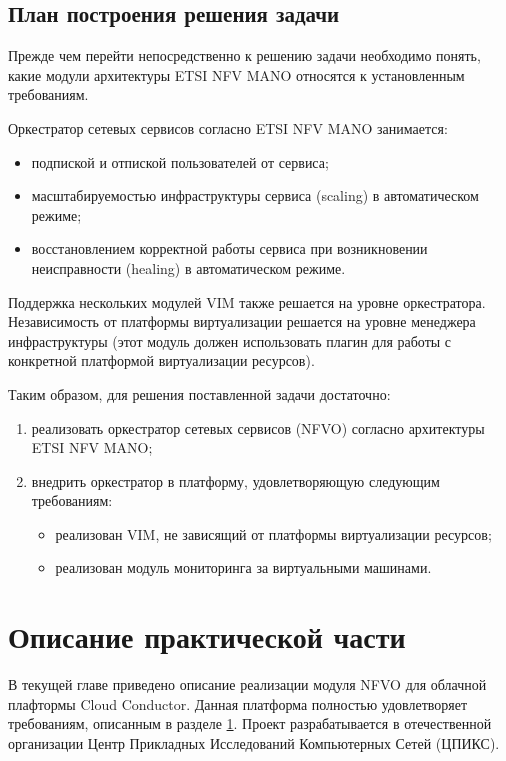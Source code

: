 \documentclass[oneside,final,14pt,a4paper]{extreport}
\begin{document}
\section{План построения решения задачи}
\label{section-platform-requirements}
Прежде чем перейти непосредственно к решению задачи необходимо понять, какие модули архитектуры ETSI NFV MANO относятся к установленным требованиям.

Оркестратор сетевых сервисов согласно ETSI NFV MANO занимается:
\begin{itemize}
	\item подпиской и отпиской пользователей от сервиса;
	\item масштабируемостью инфраструктуры сервиса (scaling) в автоматическом режиме;
	\item восстановлением корректной работы сервиса при возникновении неисправности (healing) в автоматическом режиме.
\end{itemize}

Поддержка нескольких модулей VIM также решается на уровне оркестратора. Независимость от платформы виртуализации решается на уровне менеджера инфраструктуры (этот модуль должен использовать плагин для работы с конкретной платформой виртуализации ресурсов).

Таким образом, для решения поставленной задачи достаточно:
\begin{enumerate}
	\item реализовать оркестратор сетевых сервисов (NFVO) согласно архитектуры ETSI NFV MANO;
	\item внедрить оркестратор в платформу, удовлетворяющую следующим требованиям:
	\begin{itemize}
		\item реализован VIM, не зависящий от платформы виртуализации ресурсов;
		\item реализован модуль мониторинга за виртуальными машинами.
	\end{itemize}
\end{enumerate}





\chapter{Описание практической части}
В текущей главе приведено описание реализации модуля NFVO для облачной плафтормы Cloud Conductor. Данная платформа полностью удовлетворяет требованиям, описанным в разделе \ref{section-platform-requirements}. Проект разрабатывается в отечественной организации Центр Прикладных Исследований Компьютерных Сетей (ЦПИКС).
\end{document}
